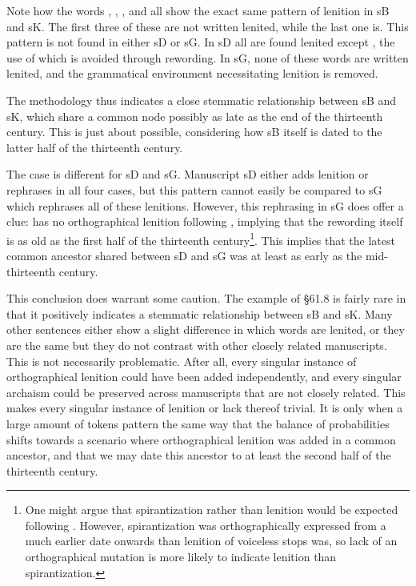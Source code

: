 Note how the words , , , and  all show the exact same pattern of lenition in \gls{sB} and \gls{sK}. The first three of these are not written lenited, while the last one is. This pattern is not found in either \gls{sD} or \gls{sG}. In \gls{sD} all are found lenited except , the use of which is avoided through rewording. In \gls{sG}, none of these words are written lenited, and the grammatical environment necessitating lenition is removed. 

The methodology thus indicates a close stemmatic relationship between \gls{sB} and \gls{sK}, which share a common node possibly as late as the end of the thirteenth century. This is just about possible, considering how \gls{sB} itself is dated to the latter half of the thirteenth century.

The case is different for \gls{sD} and \gls{sG}. Manuscript \gls{sD} either adds lenition or rephrases in all four cases, but this pattern cannot easily be compared to \gls{sG} which rephrases all of these lenitions. However, this rephrasing in \gls{sG} does offer a clue:  has no orthographical lenition following , implying that the rewording itself is as old as the first half of the thirteenth century\footnote{%
  One might argue that spirantization rather than lenition would be expected following . However, spirantization was orthographically expressed from a much earlier date onwards than lenition of voiceless stops was, so lack of an orthographical mutation is more likely to indicate lenition than spirantization.}.
This implies that the latest common ancestor shared between \gls{sD} and \gls{sG} was at least as early as the mid-thirteenth century.

This conclusion does warrant some caution. The example of \S 61.8 is fairly rare in that it positively indicates a stemmatic relationship between \gls{sB} and \gls{sK}. Many other sentences either show a slight difference in which words are lenited, or they are the same but they do not contrast with other closely related manuscripts. This is not necessarily problematic. After all, every singular instance of orthographical lenition could have been added independently, and every singular archaism could be preserved across manuscripts that are not closely related. This makes every singular instance of lenition or lack thereof trivial. It is only when a large amount of tokens pattern the same way that the balance of probabilities shifts towards a scenario where orthographical lenition was added in a common ancestor, and that we may date this ancestor to at least the second half of the thirteenth century.

